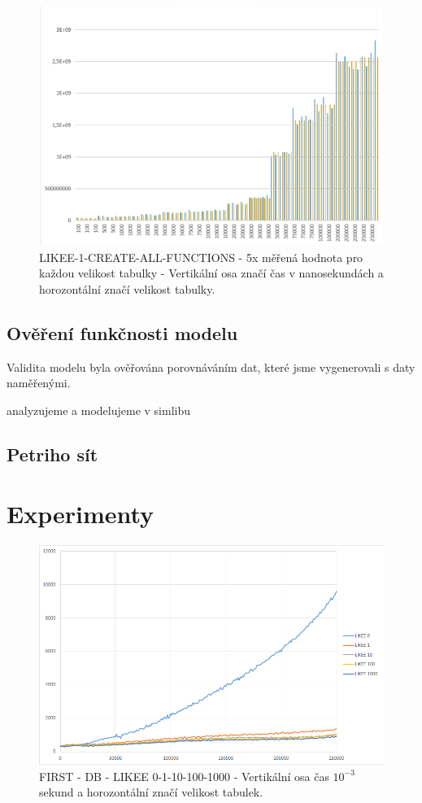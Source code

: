 \documentclass[a4paper, 11pt]{article}
\begin{document}
\begin{figure}[H]
\centering
\includegraphics[width=150mm, frame]{images/LIKEE-1-CREATE-ALL-FUNCTIONS.png}
\caption{LIKEE-1-CREATE-ALL-FUNCTIONS - 5x měřená hodnota pro každou velikost tabulky - Vertikální osa značí čas v nanosekundách a horozontální značí velikost tabulky.}
\label{sec:obr2}
\end{figure}

\subsection{Ověření funkčnosti modelu}
Validita modelu byla ověřována porovnáváním dat, které jsme vygenerovali s daty naměřenými.

analyzujeme a modelujeme v simlibu\cite{simlib_web, simlib_zdroj}

\subsection{Petriho sít}

\section{Experimenty}


\begin{figure}[H]
\centering
\includegraphics[width=150mm, frame]{images/FIRST-DB.png}
\caption{FIRST - DB - LIKEE 0-1-10-100-1000 - Vertikální osa čas $10^{-3}$ sekund a horozontální značí velikost tabulek.}
\label{sec:obr5}
\end{figure}
\end{document}
